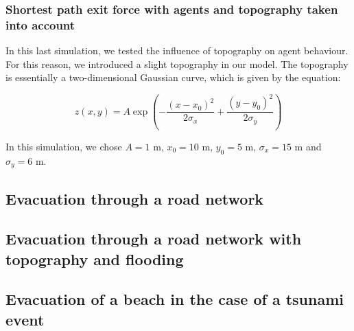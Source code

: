 \documentclass[11pt]{article}
\begin{document}
\subsubsection{Shortest path exit force with agents and topography taken into account}

In this last simulation, we tested the influence of topography on agent behaviour. For this reason, we introduced a slight topography in our model. The topography is essentially a two-dimensional Gaussian curve, which is given by the equation:

\begin{equation}
	z(x,y) = A\exp \left(- \frac{\left(x-x_0\right)^2}{2\sigma_x} + \frac{\left(y-y_0\right)^2}{2\sigma_y}\right)
\end{equation}

In this simulation, we chose $A = 1 $ m, $x_0 = 10$ m, $y_0 = 5$ m, $\sigma_x = 15$ m and $\sigma_y = 6$ m.


\subsection{Evacuation through a road network}

\subsection{Evacuation through a road network with topography and flooding}

\subsection{Evacuation of a beach in the case of a tsunami event}
\end{document}
